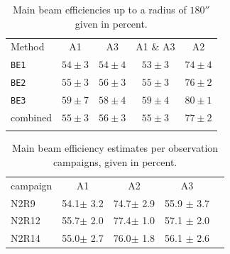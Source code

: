 
\begin{table}[!h]
  \caption[]{Main beam efficiencies up to a radius of $180''$ given in percent.}
  \label{tab:beam_efficiency}
  \centering
  \begin{tabular}{l cccc}
    \hline\hline
    \noalign{\smallskip}
    Method & A1 &  A3 & A1 $\&$ A3 &  A2  \\
    \noalign{\smallskip}
    \hline
    \noalign{\smallskip}
    {\tt BE1}  &  $54 \pm 3$  & $54 \pm 4$  &  $53 \pm 3$  &  $74 \pm 4$  \\
    {\tt BE2} &  $55 \pm 3$  & $56 \pm 3$  &  $55 \pm 3$  &  $76 \pm 2$  \\
    {\tt BE3}&  $59 \pm 7$  & $58 \pm 4$  &  $59 \pm 4$  &  $80 \pm 1$  \\
    combined          &  $55 \pm 3$  & $56 \pm 3$  &  $55 \pm 3$  &  $77 \pm 2$  \\
    \noalign{\smallskip}
    \hline
  \end{tabular}
\end{table}


\begin{table}[!ht]
\caption{Main beam efficiency estimates per observation campaigns,
given in percent.}
\label{tab:MB}
\centering
\begin{tabular}{lcccc}
\hline\hline
\noalign{\smallskip}
campaign &  A1    &    A2   &  A3    \\
\noalign{\smallskip}
\hline
\noalign{\smallskip}
N2R9    &  54.1$\pm$ 3.2   &  74.7$\pm$ 2.9  & 55.9 $\pm$ 3.7      \\
N2R12   &  55.7$\pm$ 2.0   &  77.4$\pm$ 1.0  & 57.1 $\pm$ 2.0      \\
N2R14   &  55.0$\pm$ 2.7   &  76.0$\pm$ 1.8  & 56.1 $\pm$ 2.6     \\
            \hline
\end{tabular}
\end{table}


